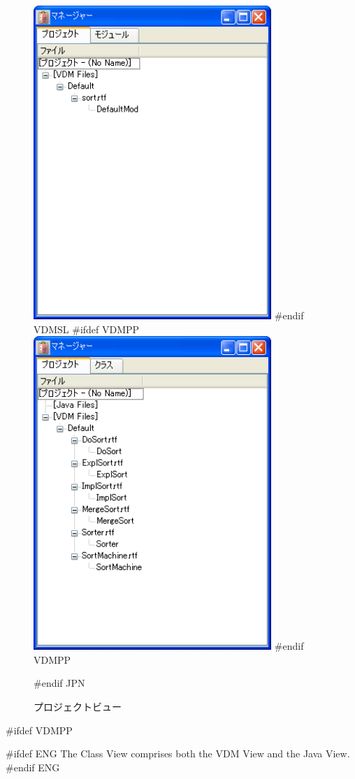\documentclass[\pformat,12pt]{article}
\newcommand{\guicmd}[1]{{\sf #1}}
\newcommand{\guicmd}[1]{{\gt #1}}
\begin{document}
\begin{figure}[tbh]
\begin{center}
\includegraphics[width=9cm]{projectView-sl.png}
#endif VDMSL
#ifdef VDMPP
\includegraphics[width=9cm]{projectView-pp.png}
#endif VDMPP
\caption{プロジェクトビュー}
#endif JPN
\label{fig:projectView}
\end{center}
\end{figure}

#ifdef VDMPP

#ifdef ENG
The \guicmd{Class View} comprises both the \guicmd{VDM View} and the
\guicmd{Java View}.
#endif ENG
\end{document}
